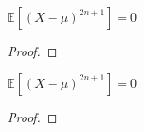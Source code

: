 \begin{lemma}
  \label{lem:centralMoment_odd_semicircleReal}
  \notready
  $\mathbb{E}[(X  - \mu)^{2n + 1}] = 0 $
  \begin{proof}
   \end{proof}
\end{lemma}


\begin{lemma}
  \label{lem:centralMoment_fun_odd_semicircleReal}
  \notready
   $\mathbb{E}[(X  - \mu)^{2n + 1}] = 0 $
   \begin{proof}
   \end{proof}
\end{lemma}



